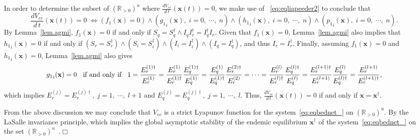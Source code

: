\documentclass[a4paper]{article}
\newcommand{\edem}{\hfill $\Box$ }
\newtheorem{rmq}{Remark}[section]
\begin{document}
\noindent In order to determine the subset of $(\mathbb R_{>0})^u$ where $\frac{dV_{ee}}{d\,t}(\mathbf x(t))= 0$, we make use of ~\eqref{eq:eqliapeeder2} to conclude that
$$\frac{dV_{ee}}{d\,t}(\mathbf x(t))= 0\;\Leftrightarrow(f_1(\mathbf x)=0)\wedge ({g_1}_i(\mathbf x),\;i=0,\;\cdots,\;n)\wedge ({h_1}_i(\mathbf x),\;i=0,\;\cdots,\;n)\wedge ({p_1}_i(\mathbf x),\;i=0,\;\cdots,\;n).$$ 
By Lemma~\ref{lem.agmi},  $f_1(\mathbf x)=0$ if and only if $S_q=S^\dagger _q\wedge  I_qI^\dagger _r=I^\dagger _qI_r$. 
Given that $f_1(\mathbf x)=0$, Lemma~\ref{lem.agmi} also implies that ${h_1}_i(\mathbf x)=0$ if and only if $(S_r=S^\dagger _r)\wedge  (S_i=S^\dagger _i) \wedge (I_i=I^\dagger _i) \wedge  (I_q=I^\dagger _q)$, and thus $I_r=I^\dagger _r$.
Finally, assuming $f_1(\mathbf x)=0$ and ${h_1}_i(\mathbf x)=0$, Lemma~\ref{lem.agmi} also gives  
$${g_1}_i(\mathbf x)=0\;\;\hbox{ if and only if }\;\;1=\frac{E^{(1)\dagger }_r}{E^{(1)}_r} = \frac{ E^{(1)}_r}{ E^{(1)\dagger }_r}\frac{E^{(1)\dagger }_q}{E^{(1)}_q}= \frac{E^{(1)}_q}{E^{(1)\dagger }_q}\frac{E^{(2)\dagger }_r}{E^{(2)}_r}=\cdots =  \frac{ E^{(l)}_r}{ E^{(l)\dagger }_r}\frac{E^{(l)\dagger }_q}{E^{(l)}_q}=  \frac{ E^{(l+1)\dagger }_r}{ E^{(l+1)}_r}\frac{E^{(l)}_q}{E^{(l)\dagger }_q} =\frac{E^{(l+1)}_r}{E^{(l+1)\dagger }_r},$$ 
which implies $E^{(j)}_r=E^{(j)\dagger }_r, \;j=1,\;\cdots,\;l+1$ and $E^{(j)}_q=E^{(j)\dagger }_q, \;j=1,\;\cdots,\;l$. Thus, $\frac{dV_{ee}}{d\,t}(\mathbf x(t))= 0$ if and only if $\mathbf x = \mathbf x^\dagger $. 

From the above discussion we may conclude that $V_{ee}$ is a strict Lyapunov function for the system~\eqref{eq:eqbednet_} on $(\mathbb R_{>0})^u$. By the LaSalle invariance principle, which implies the global asymptotic stability of the endemic equilibrium $\mathbf x^\dagger $ of the system~\eqref{eq:eqbednet_} on the set $(\mathbb R_{>0})^u$~\cite{Bhatia70, Las68, MR0481301, MR0594977}.\edem
\end{document}
